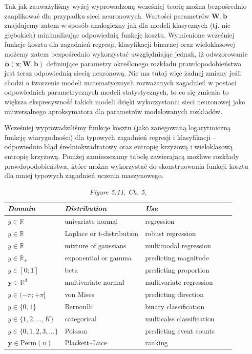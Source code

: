 \documentclass{myclass}
\numberwithin{equation}{subsection}
\begin{document}
Tak jak zauważyliśmy wyżej wyprowadzoną wcześniej teorię można bezpośrednio zaaplikować dla
przypadku sieci neuronowych. Wartości parametrów \(\bm{W}, \bm{b}\) znajdujemy zatem w sposób
analogiczny jak dla modeli klasycznych (tj. nie głębokich) minimalizując odpowiednią funkcję kosztu.
Wymienione wcześniej funkcje kosztu dla zagadnień regresji, klasyfikacji binarnej oraz wieloklasowej
możemy zatem bezpośrednio wykorzystać uwzględniając jednak, iż odwzorowanie \(\bm{\phi}(\bm{x};
\bm{W}, \bm{b})\) definiujące parametry określonego rozkładu prawdopodobieństwa jest teraz
odpowiednią siecią neuronową. Nie ma tutaj więc żadnej zmiany jeśli chodzi o tworzenie modeli
matematycznych rozważanych zagadnień w postaci odpowiednich parametrycznych modeli statystycznych,
to co się zmienia to większa ekspresywność takich modeli dzięki wykorzystaniu sieci neuronowej jako
uniwersalnego aproksymatora dla parametrów modelowanych rozkładów.

Wcześniej wyprowadziliśmy funkcje kosztu (jako zanegowaną logarytmiczną funkcję wiarygodności) dla
typowych zagadnień regresji i klasyfikacji -- odpowiednio błąd średniokwadratowy oraz entropię
krzyżową i wieloklasową entropię krzyżową. Poniżej zamieszczamy tabelę zawierającą możliwe rozkłady
prawdopodobieństwa, które można wykorzystać do skonstruowania funkcji kosztu dla mniej typowych
zagadnień uczenia maszynowego.

\begin{table}[ht]
\centering
\begin{tabular}{*5l}
\toprule
\textit{Domain} & \textit{Distribution} & \textit{Use} \\
\midrule
\(y \in \mathbb{R}\)            & univariate normal         & regression                \\ 
\(y \in \mathbb{R}\)            & Laplace or t-distribution & robust regression         \\ 
\(y \in \mathbb{R}\)            & mixture of gaussians      & multimodal regression     \\ 
\(y \in \mathbb{R}_+\)          & exponential or gamma      & predicting magnitude      \\ 
\(y \in [0;1]\)                 & beta                      & predicting proportion     \\ 
\(\bm{y} \in \mathbb{R}^d\)     & multivariate normal       & multivariate regression   \\ 
\(y \in (-\pi; +\pi]\)          & von Mises                 & predicting direction      \\ 
\(y \in \{0,1\}\)               & Bernoulli                 & binary classification     \\ 
\(y \in \{1,2,\ldots, K\}\)     & categorical               & multicalss classification \\ 
\(y \in \{0,1,2,3,\ldots\}\)    & Poisson                   & predicting event counts   \\ 
\(\bm{y} \in \mathrm{Perm}(n)\) & Plackett--Luce            & ranking                   \\ 
\bottomrule
\hline
\end{tabular}
\caption{\textit{Figure 5.11, Ch. 5, \cite{prince2023understanding}}}
\end{table}
\end{document}
